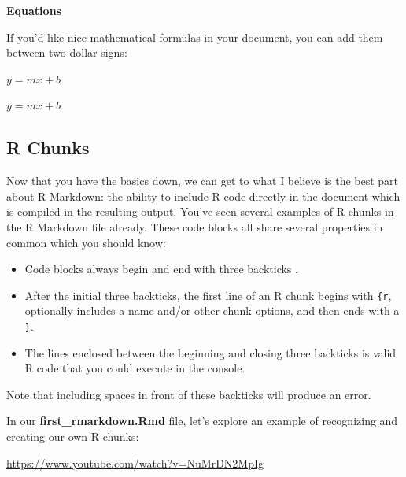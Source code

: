 \documentclass[]{tufte-book}
\newenvironment{Shaded}{\begin{snugshade}}{\end{snugshade}}
\newcommand{\NormalTok}[1]{#1}
\providecommand{\tightlist}{%
  \setlength{\itemsep}{0pt}\setlength{\parskip}{0pt}}
\begin{document}
\vspace*{0.2in}

\noindent\textbf{Equations}\vspace*{0.1in}

If you'd like nice mathematical formulas in your document, you can add them between two dollar signs:

\begin{Shaded}
\begin{Highlighting}[]
\NormalTok{$y = mx + b$}
\end{Highlighting}
\end{Shaded}

\(y = mx + b\)

\hypertarget{r-chunks}{%
\subsection{R Chunks}\label{r-chunks}}

Now that you have the basics down, we can get to what I believe is the best part about R Markdown: the ability to include R code directly in the document which is compiled in the resulting output. You've seen several examples of R chunks in the R Markdown file already. These code blocks all share several properties in common which you should know:

\begin{itemize}
\tightlist
\item
  Code blocks always begin and end with three backticks \texttt{\textasciigrave{}\textasciigrave{}\textasciigrave{}}.
\item
  After the initial three backticks, the first line of an R chunk begins with \texttt{\{r}, optionally includes a name and/or other chunk options, and then ends with a \texttt{\}}.
\item
  The lines enclosed between the beginning and closing three backticks is valid R code that you could execute in the console.
\end{itemize}

Note that including spaces in front of these backticks will produce an error.

In our \textbf{first\_rmarkdown.Rmd} file, let's explore an example of recognizing and creating our own R chunks:

\vspace{0.1in}\begin{center}\footnotesize{\url{https://www.youtube.com/watch?v=NuMrDN2MpIg}}\end{center}\vspace{0.1in}
\end{document}
